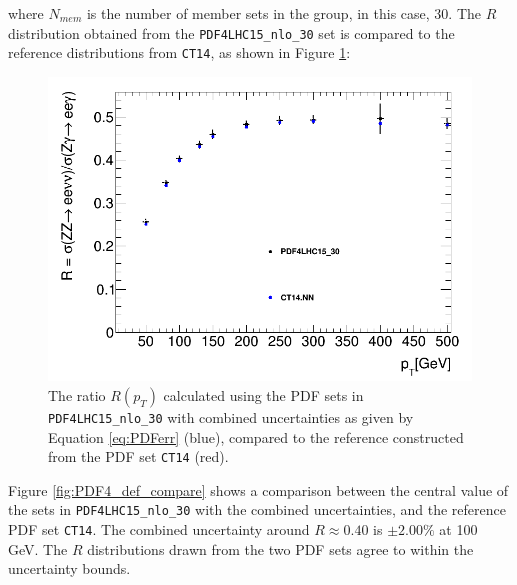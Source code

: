 \documentclass[11pt,a4paper]{report}
\begin{document}
where $N_{mem}$ is the number of member sets in the group, in this case, 30. The $R$ distribution obtained from the \texttt{PDF4LHC15\_nlo\_30} set is compared to the reference distributions from \texttt{CT14}, as shown in Figure \ref{pdfcompare}:
\begin{figure}[H]
\centering
	\includegraphics[width = 0.6\linewidth]{PDF4_CT14_comp.png}
	\caption{The ratio $R(p_T)$ calculated using the PDF sets in \texttt{PDF4LHC15\_nlo\_30} with combined uncertainties as given by Equation \ref{eq:PDFerr} (blue), compared to the reference constructed from the PDF set \texttt{CT14} (red).}
	\label{fig:PDF4_def_compare}
	\label{pdfcompare}
\end{figure}
\noindent Figure \ref{fig:PDF4_def_compare} shows a comparison between the central value of the sets in \texttt{PDF4LHC15\_nlo\_30} with the combined uncertainties, and the reference PDF set \texttt{CT14}. The combined uncertainty around $R \approx 0.40$ is $\pm 2.00\%$ at 100 GeV. The $R$ distributions drawn from the two PDF sets agree to within the uncertainty bounds.

\end{document}
